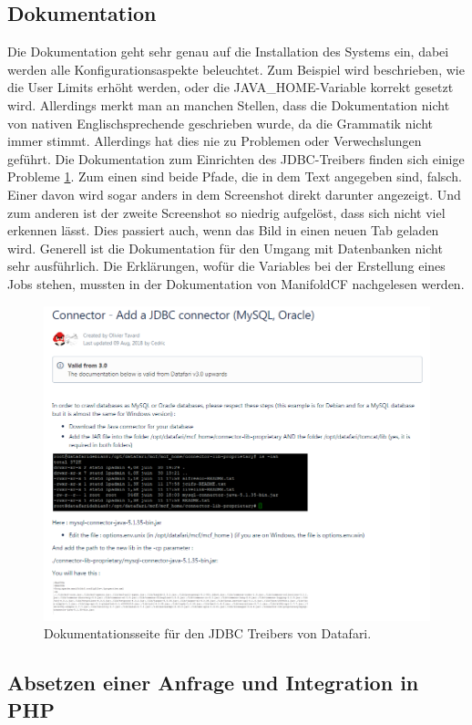 \subsection{Dokumentation}

Die Dokumentation geht sehr genau auf die Installation des Systems ein, dabei werden alle Konfigurationsaspekte beleuchtet. Zum Beispiel wird beschrieben, wie die User Limits erhöht werden, oder die JAVA\_HOME-Variable korrekt gesetzt wird. Allerdings merkt man an manchen Stellen, dass die Dokumentation nicht von nativen Englischsprechende geschrieben wurde, da die Grammatik nicht immer stimmt. Allerdings hat dies nie zu Problemen oder Verwechslungen geführt.
Die Dokumentation zum Einrichten des JDBC-Treibers finden sich einige Probleme \ref{img:datafariJDBC}. Zum einen sind beide Pfade, die in dem Text angegeben sind, falsch. Einer davon wird sogar anders in dem Screenshot direkt darunter angezeigt. Und zum anderen ist der zweite Screenshot so niedrig aufgelöst, dass sich nicht viel erkennen lässt. Dies passiert auch, wenn das Bild in einen neuen Tab geladen wird. Generell ist die Dokumentation für den Umgang mit Datenbanken nicht sehr ausführlich. Die Erklärungen, wofür die Variables bei der Erstellung eines Jobs stehen, mussten in der Dokumentation von ManifoldCF nachgelesen werden.

\begin{figure}
	\centering
	\includegraphics[width=1\linewidth]{images/datafari_doku_wrong_path.png}
	\caption{Dokumentationsseite für den JDBC Treibers von Datafari.}
	\label{img:datafariJDBC}
\end{figure}


\subsection{Absetzen einer Anfrage und Integration in PHP}
